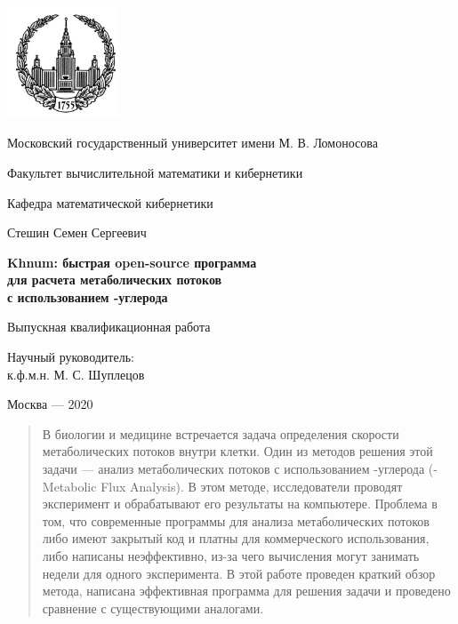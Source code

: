 \documentclass[a4paper, 12pt, left=30mm, right=15mm, top=20mm, bottom=20mm]{report}
\begin{document}
\begin{titlepage}

	\begin{centering}
		\includegraphics[width=0.25\textwidth]{logo.png}\par
	\end{centering}
	\centerline{Московский государственный университет имени М. В. Ломоносова}
	\centerline{Факультет вычислительной математики и кибернетики}
	\centerline{Кафедра математической кибернетики}
	\centerline{\hfill\hrulefill\hrulefill\hfill}
	\vfill
	\vfill
	\large
	\centerline{Стешин Семен Сергеевич}
	\vfill
	\Large
	\begin{centering}
		\textbf{Khnum: быстрая open-source программа \\ для расчета метаболических потоков \\ с использованием -углерода}
		
	\end{centering}
	\normalsize
	\vfill
	\centerline{Выпускная квалификационная работа}
	\vfill
	\vfill
	\begin{flushright}
	Научный руководитель:\\
	к.ф.м.н. М. С. Шуплецов
	\end{flushright}
	\vfill
	\vfill
	\centerline{Москва --- 2020}

\end{titlepage}



\begin{abstract}
В биологии и медицине встречается задача определения скорости метаболических потоков внутри клетки. 
Один из методов решения этой задачи --- анализ метаболических потоков с использованием -углерода (-Metabolic Flux Analysis). 
В этом методе, исследователи проводят эксперимент и обрабатывают его результаты на компьютере. Проблема в том, что современные программы для анализа метаболических потоков либо имеют закрытый код и платны для коммерческого использования, либо написаны неэффективно, из-за чего вычисления могут занимать недели для одного эксперимента. В этой работе проведен краткий обзор метода, написана эффективная программа для решения задачи и проведено сравнение с существующими аналогами.
\end{abstract}
\end{document}
